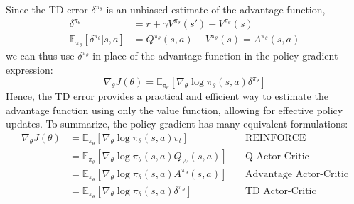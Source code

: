 Since the TD error $\delta^{\pi_\theta}$ is an unbiased estimate of the advantage function,
\begin{equation}
  \begin{aligned}
    \delta^{\pi_\theta} &= r+ \gamma V^{\pi_\theta}(s') - V^{\pi_\theta}(s) \\
    \mathbb{E}_{\pi_\theta}[\delta^{\pi_\theta}|s, a] &= Q^{\pi_\theta}(s, a) - V^{\pi_\theta}(s) = A^{\pi_\theta}(s, a)
  \end{aligned}
\end{equation}
we can thus use $\delta^{\pi_\theta}$ in place of the advantage function in the policy gradient expression:
\begin{equation} \label{chap2:eq:pg_td}
  \nabla_\theta J(\theta) = \mathbb{E}_{\pi_\theta} [\nabla_\theta \log \pi_\theta(s, a) \delta^{\pi_\theta}]
\end{equation}
Hence, the TD error provides a practical and efficient way to estimate the advantage function using only the value function, allowing for effective policy updates.
To summarize, the policy gradient has many equivalent formulations:
\begin{equation}
  \begin{aligned}
    \nabla_\theta J(\theta)
    &= \mathbb{E}_{\pi_\theta}[\nabla_\theta \log \pi_\theta(s, a) v_t] &\quad \text{REINFORCE} \\
    &= \mathbb{E}_{\pi_\theta}[\nabla_\theta \log \pi_\theta(s, a) Q_W(s, a)] &\quad \text{Q Actor-Critic} \\
    &= \mathbb{E}_{\pi_\theta}[\nabla_\theta \log \pi_\theta(s, a) A^{\pi_\theta}(s, a)] &\quad \text{Advantage Actor-Critic} \\
    &= \mathbb{E}_{\pi_\theta}[\nabla_\theta \log \pi_\theta(s, a) \delta^{\pi_\theta}] &\quad \text{TD Actor-Critic}
  \end{aligned}
\end{equation}

